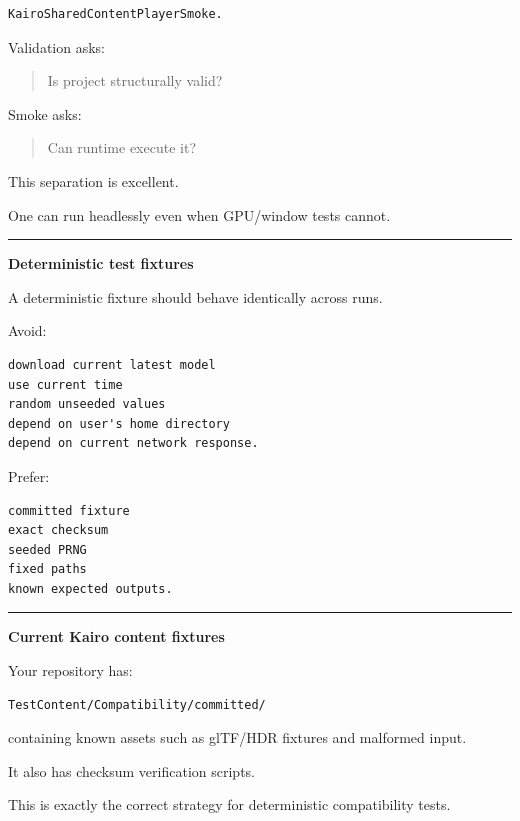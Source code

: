 \begin{verbatim}
KairoSharedContentPlayerSmoke.
\end{verbatim}

Validation asks:

\begin{quote}
Is project structurally valid?
\end{quote}

Smoke asks:

\begin{quote}
Can runtime execute it?
\end{quote}

This separation is excellent.

One can run headlessly even when GPU/window tests cannot.

\begin{center}\rule{0.5\linewidth}{0.5pt}\end{center}

\textbf{Deterministic test fixtures}

A deterministic fixture should behave identically across runs.

Avoid:

\begin{verbatim}
download current latest model
use current time
random unseeded values
depend on user's home directory
depend on current network response.
\end{verbatim}

Prefer:

\begin{verbatim}
committed fixture
exact checksum
seeded PRNG
fixed paths
known expected outputs.
\end{verbatim}

\begin{center}\rule{0.5\linewidth}{0.5pt}\end{center}

\textbf{Current Kairo content fixtures}

Your repository has:

\begin{verbatim}
TestContent/Compatibility/committed/
\end{verbatim}

containing known assets such as glTF/HDR fixtures and malformed input.

It also has checksum verification scripts.

This is exactly the correct strategy for deterministic compatibility tests.

